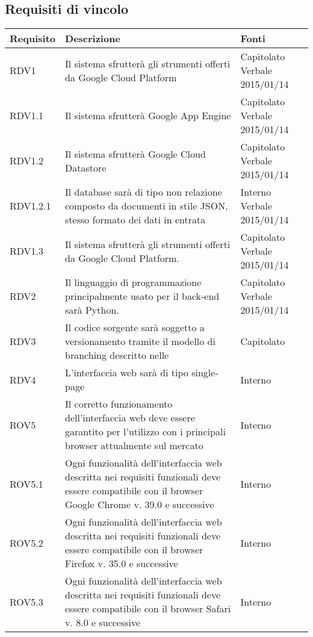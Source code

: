 \subsection{Requisiti di vincolo}

\begin{center}

	\def\arraystretch{1.5}
	\bgroup
	\begin{longtable}{| p{2.5cm} | p{8cm} | p{2cm} |}

		\hline
		\textbf{Requisito} & \textbf{Descrizione} & \textbf{Fonti} \\
		\hline

		RDV1  &  Il sistema sfrutterà gli strumenti offerti da Google Cloud Platform  &  Capitolato \newline Verbale 2015/01/14 \\
		\hline
		RDV1.1  &  Il sistema sfrutterà Google App Engine  &  Capitolato \newline Verbale 2015/01/14 \\
		\hline
		RDV1.2  &  Il sistema sfrutterà Google Cloud Datastore  &  Capitolato \newline Verbale 2015/01/14 \\
		\hline
		RDV1.2.1  &  Il database sarà di tipo non relazione composto da documenti in stile JSON, stesso formato dei dati in entrata  &  Interno \newline Verbale 2015/01/14 \\
		\hline
		RDV1.3  &  Il sistema sfrutterà gli strumenti offerti da Google Cloud Platform.  &  Capitolato \newline Verbale 2015/01/14 \\
		\hline
		RDV2  &  Il linguaggio di programmazione principalmente usato per il back-end sarà Python.  &  Capitolato \newline Verbale 2015/01/14 \\
		\hline
		RDV3  &  Il codice sorgente sarà soggetto a versionamento tramite il modello di branching descritto nelle \docNameVersionNdP  &  Capitolato \\
		\hline
		RDV4  &  L'interfaccia web sarà di tipo single-page  &  Interno \\
		\hline
		ROV5  &  Il corretto funzionamento dell'interfaccia web deve essere garantito per l'utilizzo con i principali browser attualmente sul mercato   &  Interno \\
		\hline
		ROV5.1  &  Ogni funzionalità dell'interfaccia web descritta nei requisiti funzionali deve essere compatibile con il browser Google Chrome v. 39.0 e successive   &  Interno \\
		\hline
		ROV5.2  &  Ogni funzionalità dell'interfaccia web descritta nei requisiti funzionali deve essere compatibile con il browser Firefox v. 35.0 e successive   &  Interno \\
		\hline
		ROV5.3  &  Ogni funzionalità dell'interfaccia web descritta nei requisiti funzionali deve essere compatibile con il browser Safari v. 8.0 e successive   &  Interno \\
		\hline


\end{longtable}
\end{center}
